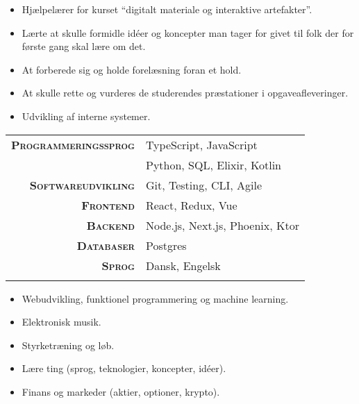 \documentclass[10pt,a4paper,ragged2e,dvipsnames]{altacv}
\begin{document}
    \divider

    \begin{itemize}
      \item Hjælpelærer for kurset ``digitalt materiale og interaktive artefakter''.
      \item Lærte at skulle formidle idéer og koncepter man tager for givet til folk der for første gang skal lære om det.
      \item At forberede sig og holde forelæsning foran et hold.
      \item At skulle rette og vurderes de studerendes præstationer i opgaveafleveringer.
    \end{itemize}

    \divider

    \begin{itemize}
      \item Udvikling af interne systemer.
    \end{itemize}

    \smallskip
    \begin{tabular}{rl}
      \makeatletter
      \textsc{\textbf{Programmeringssprog}} & TypeScript, JavaScript \\
      & Python, SQL, Elixir, Kotlin \\
      \textsc{\textbf{Softwareudvikling}} & Git, Testing, CLI, Agile \\
      \textsc{\textbf{Frontend}} & React, Redux, Vue \\
      \textsc{\textbf{Backend}} & Node.js, Next.js, Phoenix, Ktor \\
      \textsc{\textbf{Databaser}} & Postgres \\
      \textsc{\textbf{Sprog}} & Dansk, Engelsk \\
      \makeatother
    \end{tabular}

    \smallskip
    \begin{itemize}
      \item Webudvikling, funktionel programmering og machine learning.
      \item Elektronisk musik.
      \item Styrketræning og løb.
      \item Lære ting (sprog, teknologier, koncepter, idéer).
      \item Finans og markeder (aktier, optioner, krypto).
    \end{itemize}
\end{document}
